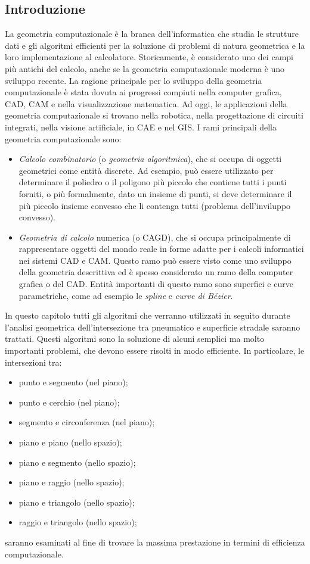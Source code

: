 \subsection{Introduzione}
La geometria computazionale è la branca dell'informatica che studia le strutture dati e gli algoritmi efficienti per la soluzione di problemi di natura geometrica e la loro implementazione al calcolatore. Storicamente, è considerato uno dei campi più antichi del calcolo, anche se la geometria computazionale moderna è uno sviluppo recente. La ragione principale per lo sviluppo della geometria computazionale è stata dovuta ai progressi compiuti nella computer grafica, \ac{CAD}, \ac{CAM} e nella visualizzazione matematica. Ad oggi, le applicazioni della geometria computazionale si trovano nella robotica, nella progettazione di circuiti integrati, nella visione artificiale, in \ac{CAE} e nel \ac{GIS}. I rami principali della geometria computazionale sono:
\begin{itemize}
	\item \textit{Calcolo combinatorio} (o \textit{geometria algoritmica}), che si occupa di oggetti geometrici come entità discrete. Ad esempio, può essere utilizzato per determinare il poliedro o il poligono più piccolo che contiene tutti i punti forniti, o più formalmente, dato un insieme di punti, si deve determinare il più piccolo insieme convesso che li contenga tutti (problema dell'inviluppo convesso).
	\item \textit{Geometria di calcolo} numerica (o \ac{CAGD}), che si occupa principalmente di rappresentare oggetti del mondo reale in forme adatte per i calcoli informatici nei sistemi \ac{CAD} e \ac{CAM}. Questo ramo può essere visto come uno sviluppo della geometria descrittiva ed è spesso considerato un ramo della computer grafica o del \ac{CAD}. Entità importanti di questo ramo sono superfici e curve parametriche, come ad esempio le \textit{spline} e \textit{curve di Bézier}.
\end{itemize}

In questo capitolo tutti gli algoritmi che verranno utilizzati in seguito durante l'analisi geometrica dell'intersezione tra pneumatico e superficie stradale saranno trattati. Questi algoritmi sono la soluzione di alcuni semplici ma molto importanti problemi, che devono essere risolti in modo efficiente. In particolare, le intersezioni tra:
\begin{itemize}
	\item punto e segmento (nel piano);
	\item punto e cerchio (nel piano);
	\item segmento e circonferenza (nel piano);
	\item piano e piano (nello spazio);
	\item piano e segmento (nello spazio);
	\item piano e raggio (nello spazio);
	\item piano e triangolo (nello spazio);
	\item raggio e triangolo (nello spazio);
\end{itemize}
saranno esaminati al fine di trovare la massima prestazione in termini di efficienza computazionale.
%

